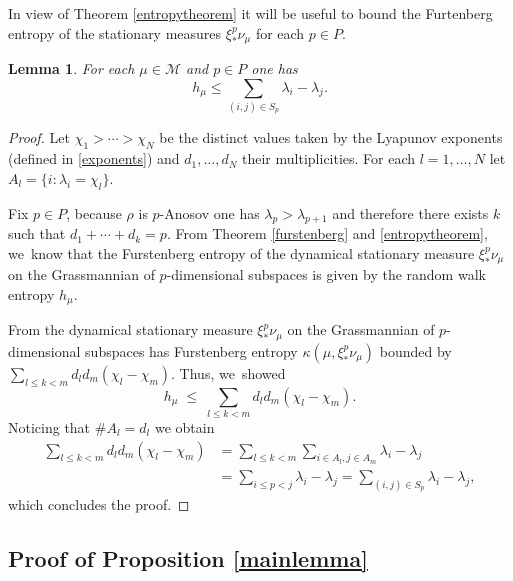 \documentclass[10pt]{amsart}
\newtheorem{lemma}[theorem]{Lemma}
\newcommand{\M}{\mathcal M}
\begin{document}
In view of Theorem \ref{entropytheorem} it will be useful to bound the Furtenberg entropy of the stationary measures \(\xi^p_*\nu_\mu\) for each \(p \in P\).

\begin{lemma}\label{entropyupperboundlemma}
For each \(\mu \in \M\) and \(p \in P\) one has
\[
h_\mu \le \sum_{(i,j) \in S_p}\lambda_i - \lambda_j.
\]
\end{lemma}
\begin{proof}
Let \(\chi_1 > \cdots > \chi_N\) be the distinct values taken by the Lyapunov exponents (defined in \eqref{exponents}) and \(d_1,\ldots, d_N\) their multiplicities. For each \(l = 1,\ldots, N\) let
\hbox{\(A_l = \lbrace i: \lambda_i = \chi_l\rbrace\)}.

Fix \(p \in P\), because \(\rho\) is \(p\)-Anosov one has \(\lambda_{p} > \lambda_{p+1}\) and therefore there exists \(k\) such that \(d_1 + \cdots + d_k = p\). From Theorem \ref{furstenberg} and \ref{entropytheorem}, we~know that the Furstenberg entropy of the dynamical stationary measure \(\xi^p_*\nu_\mu\) on the Grassmannian of \(p\)\nobreakdash-dimensional subspaces is given by the random walk entropy \(h_\mu\).

From \cite[Th.\,2.1]{LL23} the dynamical stationary measure \(\xi^p_*\nu_\mu\) on the Grassmannian of \(p\)-dimensional subspaces has Furstenberg entropy \(\kappa(\mu,\xi^p_*\nu_\mu)\) bounded by \(\sum_{l \le k < m}d_l d_m(\chi_l - \chi_m)\). Thus, we~showed
\[
h_\mu \; \le \; \sum_{l \le k < m}d_l d_m(\chi_l - \chi_m).
\]
Noticing that \(\#A_l = d_l\) we obtain
\begin{align*}
\sum_{l \le k < m}d_l d_m(\chi_l - \chi_m) &= \sum_{l \le k < m}\sum_{i \in A_l,j \in A_m}\lambda_i - \lambda_j
\\ &= \sum_{i \le p < j}\lambda_i - \lambda_j
= \sum_{(i,j) \in S_p}\lambda_i - \lambda_j,
\end{align*}
which concludes the proof.
\end{proof}

\subsection{Proof of Proposition \ref{mainlemma}}
\end{document}
